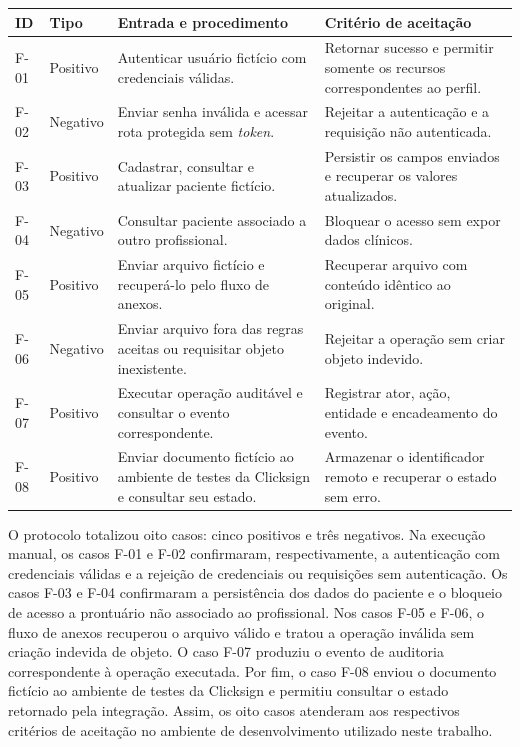 \begin{quadro}[H]
\centering
\caption{Protocolo de testes funcionais e de integração}
\label{qua:casos-funcionais}
\footnotesize
\renewcommand{\arraystretch}{1.15}
\setlength{\tabcolsep}{4pt}
\begin{tabularx}{\textwidth}{|p{0.8cm}|p{1.25cm}|X|X|}
\hline
\textbf{ID} & \textbf{Tipo} & \textbf{Entrada e procedimento} & \textbf{Critério de aceitação} \\ \hline
F-01 & Positivo & Autenticar usuário fictício com credenciais válidas. & Retornar sucesso e permitir somente os recursos correspondentes ao perfil. \\ \hline
F-02 & Negativo & Enviar senha inválida e acessar rota protegida sem \textit{token}. & Rejeitar a autenticação e a requisição não autenticada. \\ \hline
F-03 & Positivo & Cadastrar, consultar e atualizar paciente fictício. & Persistir os campos enviados e recuperar os valores atualizados. \\ \hline
F-04 & Negativo & Consultar paciente associado a outro profissional. & Bloquear o acesso sem expor dados clínicos. \\ \hline
F-05 & Positivo & Enviar arquivo fictício e recuperá-lo pelo fluxo de anexos. & Recuperar arquivo com conteúdo idêntico ao original. \\ \hline
F-06 & Negativo & Enviar arquivo fora das regras aceitas ou requisitar objeto inexistente. & Rejeitar a operação sem criar objeto indevido. \\ \hline
F-07 & Positivo & Executar operação auditável e consultar o evento correspondente. & Registrar ator, ação, entidade e encadeamento do evento. \\ \hline
F-08 & Positivo & Enviar documento fictício ao ambiente de testes da Clicksign e consultar seu estado. & Armazenar o identificador remoto e recuperar o estado sem erro. \\ \hline
\end{tabularx}
\par\vspace{0.8cm}
\end{quadro}

O protocolo totalizou oito casos: cinco positivos e três negativos. Na execução manual, os casos F-01 e F-02 confirmaram, respectivamente, a autenticação com credenciais válidas e a rejeição de credenciais ou requisições sem autenticação. Os casos F-03 e F-04 confirmaram a persistência dos dados do paciente e o bloqueio de acesso a prontuário não associado ao profissional. Nos casos F-05 e F-06, o fluxo de anexos recuperou o arquivo válido e tratou a operação inválida sem criação indevida de objeto. O caso F-07 produziu o evento de auditoria correspondente à operação executada. Por fim, o caso F-08 enviou o documento fictício ao ambiente de testes da Clicksign e permitiu consultar o estado retornado pela integração. Assim, os oito casos atenderam aos respectivos critérios de aceitação no ambiente de desenvolvimento utilizado neste trabalho.

